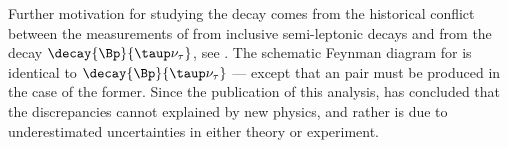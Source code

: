 Further motivation for studying the decay \btodsphi comes from the
historical conflict between the measurements of  from inclusive semi-leptonic decays and
from the decay $\decay{\Bp}{\taup\nu_\tau}$, see .
The schematic Feynman diagram for \btodsphi is identical to $\decay{\Bp}{\taup\nu_\tau}$
--- except that an \ssbar pair must be produced in the case of the former.
Since the publication of this analysis,  has concluded that the
discrepancies cannot explained by new physics, and rather is due to underestimated uncertainties in
either theory or experiment.




































